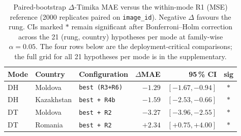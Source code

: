 \begin{table}[!htb]
\centering
\small
\caption{Paired-bootstrap $\Delta$-Timika MAE versus the within-mode R1 (MSE) reference (2000 replicates paired on \texttt{image\_id}). Negative $\Delta$ favours the rung. CIs marked $\ast$ remain significant after Bonferroni--Holm correction across the 21 (rung, country) hypotheses per mode at family-wise $\alpha=0.05$. The four rows below are the deployment-critical comparisons; the full grid for all 21 hypotheses per mode is in the supplementary.}
\label{tab:bootstrap}
\setlength{\tabcolsep}{4pt}
\begin{tabular}{l l l r r c}
\toprule
Mode & Country & Configuration & $\Delta$MAE & 95\,\% CI & sig \\
\midrule
DH & Moldova    & \texttt{best (R3+R6)}        & $-1.29$ & $[-1.67, -0.94]$ & $\ast$ \\
DH & Kazakhstan & \texttt{best + R4b}          & $-1.59$ & $[-2.53, -0.66]$ & $\ast$ \\
DT & Moldova    & \texttt{best + R2}           & $-3.27$ & $[-3.96, -2.55]$ & $\ast$ \\
DT & Romania    & \texttt{best + R2}           & $+2.34$ & $[+0.75, +4.00]$ & $\ast$ \\
\bottomrule
\end{tabular}
\end{table}
